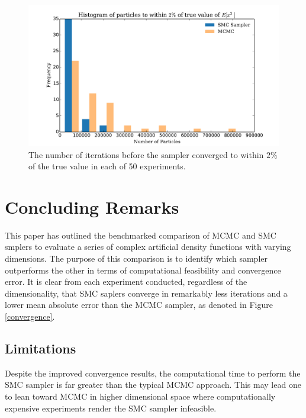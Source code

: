 \documentclass[12pt]{elsarticle}
\begin{document}
\begin{figure}[htbp]
\begin{center}
\includegraphics[width = \textwidth]{plots/iterationsEx2.pdf}
\caption{The number of iterations before the sampler converged to within $2\%$ of the true value in each of 50 experiments.}
\label{ig:itersEX2}
\end{center}
\end{figure}



\section*{Concluding Remarks}
This paper has outlined the benchmarked comparison of MCMC and SMC smplers to evaluate a series of complex artificial density functions with varying dimensions. The purpose of this comparison is to identify which sampler outperforms the other in terms of computational feasibility and convergence error. It is clear from each experiment conducted, regardless of the dimensionality, that SMC saplers converge in remarkably less iterations and a lower mean absolute error than the MCMC sampler, as denoted in Figure \ref{convergence}. \\

\subsection*{Limitations}
Despite the improved convergence results, the computational time to perform the SMC sampler is far greater than the typical MCMC approach. This may lead one to lean toward MCMC in higher dimensional space where computationally expensive experiments render the SMC sampler infeasible.
\end{document}
